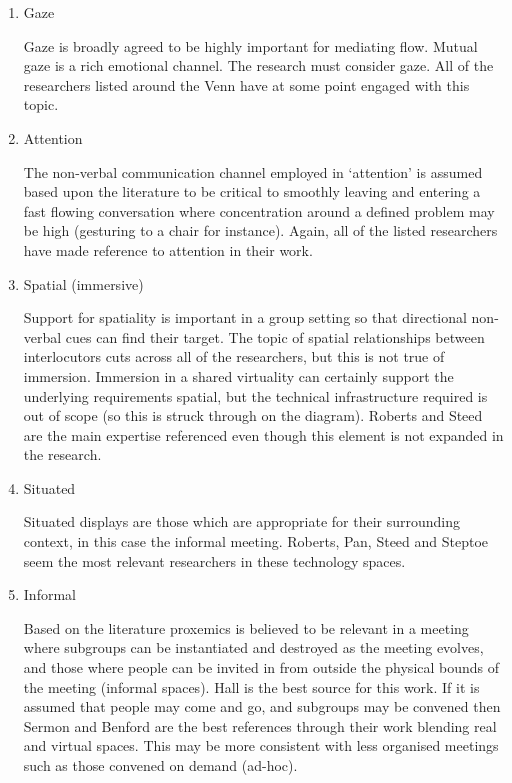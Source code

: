                 \begin{enumerate}
                \item Gaze\par
                 Gaze is broadly agreed to be highly important for mediating flow. Mutual gaze is a rich emotional channel. The research must consider gaze. All of the researchers listed around the Venn have at some point engaged with this topic.
                \item Attention\par
                The non-verbal communication channel employed in `attention' is assumed based upon the literature to be critical to smoothly leaving and entering a fast flowing conversation where concentration around a defined problem may be high (gesturing to a chair for instance). Again, all of the listed researchers have made reference to attention in their work.
                \item Spatial (immersive)\par
Support for spatiality is important in a group setting so that directional non-verbal cues can find their target. The topic of spatial relationships between interlocutors cuts across all of the researchers, but this is not true of immersion. Immersion in a shared virtuality can certainly support the underlying requirements spatial, but the technical infrastructure required is out of scope (so this is struck through on the diagram). Roberts and Steed are the main expertise referenced even though this element is not expanded in the research.
                \item Situated\par
                Situated displays are those which are appropriate for their surrounding context, in this case the informal meeting. Roberts, Pan, Steed and Steptoe seem the most relevant researchers in these technology spaces.
                \item Informal\par
                   Based on the literature proxemics is believed to be relevant in a meeting where subgroups can be instantiated and destroyed as the meeting evolves, and those where people can be invited in from outside the physical bounds of the meeting (informal spaces). Hall is the best source for this work. If it is assumed that people may come and go, and subgroups may be convened then Sermon and Benford are the best references through their work blending real and virtual spaces. This may be more consistent with less organised meetings such as those convened on demand (ad-hoc).
                \end{enumerate}

